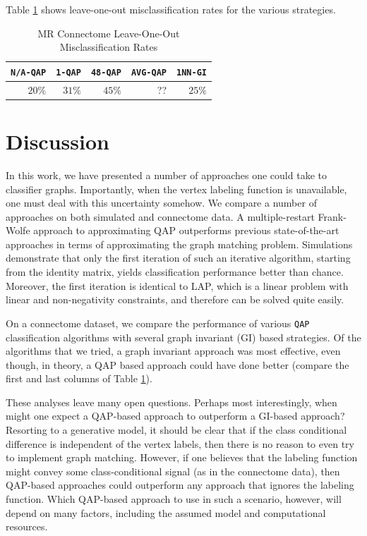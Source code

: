\documentclass{article} %
\newcommand{\qap}{\texttt{QAP} }
\begin{document}
Table \ref{tab:connectome} shows leave-one-out misclassification rates for the various strategies.


\begin{table}[h!]
\caption{MR Connectome Leave-One-Out Misclassification Rates}
\begin{center}
\begin{tabular}{|r|r|r|r|r|}
\hline
\texttt{N/A-QAP} & \texttt{1-QAP} & \texttt{48-QAP} & \texttt{AVG-QAP} & \texttt{1NN-GI}\\
\hline
$20\%$ & $31\%$ & $45\%$ & ?? & $25\%$ \\
    \hline
\end{tabular}
\end{center}
\label{tab:connectome}
\end{table}%


\section{Discussion}


In this work, we have presented a number of approaches one could take to classifier graphs.  Importantly, when the vertex labeling function is unavailable, one must deal with this uncertainty somehow.  We compare a number of approaches on both simulated and connectome data.  A multiple-restart Frank-Wolfe approach to approximating QAP outperforms previous state-of-the-art approaches in terms of approximating the graph matching problem.  Simulations demonstrate that only the first iteration of such an iterative algorithm, starting from the identity matrix, yields classification performance better than chance.  Moreover, the first iteration is identical to LAP, which is a linear problem with linear and non-negativity constraints, and therefore can be solved quite easily.  

On a connectome dataset, we compare the performance of various \qap classification algorithms with several graph invariant (GI) based strategies.  Of the algorithms that we tried, a graph invariant approach was most effective, even though, in theory, a QAP based approach could have done better (compare the first and last columns of Table \ref{tab:connectome}).  

These analyses leave many open questions.  Perhaps most interestingly, when might one expect a QAP-based approach to outperform a GI-based approach?  Resorting to a generative model, it should be clear that if the class conditional difference is independent of the vertex labels, then there is no reason to even try to implement graph matching.  However, if one believes that the labeling function might convey some class-conditional signal (as in the connectome data), then QAP-based approaches could outperform any approach that ignores the labeling function.  Which QAP-based approach to use in such a scenario, however, will depend on many factors, including the assumed model and computational resources.
\end{document}
